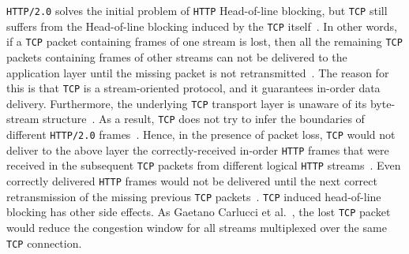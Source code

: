 \documentclass[12pt,a4paper]{report}
\begin{document}
    
    
    
    


\texttt{HTTP/2.0} solves the initial problem of \texttt{HTTP} Head-of-line blocking, but \texttt{TCP} still suffers from the Head-of-line blocking induced by the \texttt{TCP} itself~\cite{bib_making_web_faster_with_http2, bib_TCP_Head_of_line_blocking_stackoverflow, How-does-HTTP-2-solve-the-Head-of-Line-blocking-HOL-issue, head-of-line-blocking-in-quic-and-http-3-the-details}.
In other words, if a \texttt{TCP} packet containing frames of one stream is lost, then all the remaining \texttt{TCP} packets containing frames of other streams can not be delivered to the application layer until the missing packet is not retransmitted~\cite{bib_making_web_faster_with_http2, bib_TCP_Head_of_line_blocking_stackoverflow, How-does-HTTP-2-solve-the-Head-of-Line-blocking-HOL-issue}.
The reason for this is that \texttt{TCP} is a stream-oriented protocol, and it guarantees in-order data delivery.
Furthermore, the underlying \texttt{TCP} transport layer is unaware of its byte-stream structure~\cite{head-of-line-blocking-in-quic-and-http-3-the-details}.
As a result, \texttt{TCP} does not try to infer the boundaries of different \texttt{HTTP/2.0} frames~\cite{head-of-line-blocking-in-quic-and-http-3-the-details}.
Hence, in the presence of packet loss, \texttt{TCP} would not deliver to the above layer the correctly-received in-order \texttt{HTTP} frames that were received in the subsequent \texttt{TCP} packets from different logical \texttt{HTTP} streams~\cite{head-of-line-blocking-in-quic-and-http-3-the-details}.
Even correctly delivered \texttt{HTTP} frames would not be delivered until the next correct retransmission of the missing previous \texttt{TCP} packets~\cite{head-of-line-blocking-in-quic-and-http-3-the-details}.
\texttt{TCP} induced head-of-line blocking has other side effects.
As Gaetano Carlucci et al.~\cite{HTTP_over_UDP_An_Experimental_Investigation_of_QUIC}, the lost \texttt{TCP} packet would reduce the congestion window for all streams multiplexed over the same \texttt{TCP} connection.



\end{document}

